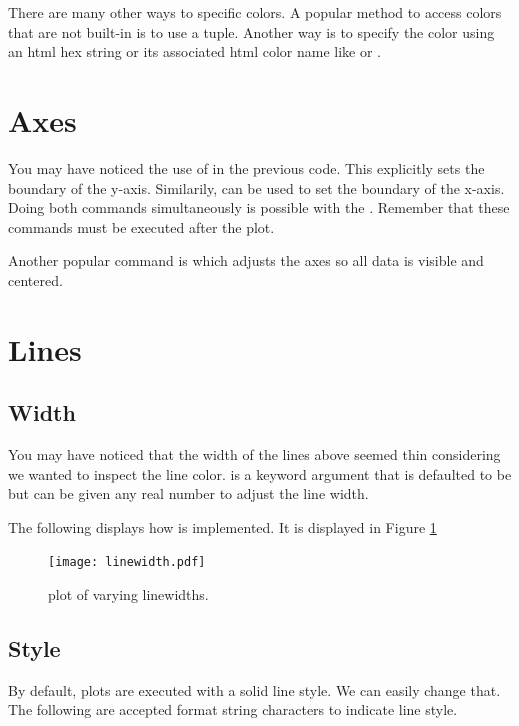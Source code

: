 There are many other ways to specific colors. A popular method to access colors that are not built-in is to use a  tuple. Another way is to specify the color using an html hex string or its associated html color name like  or . 

\section*{Axes}
You may have noticed the use of  in the previous code. This explicitly sets the boundary of the y-axis. Similarily,  can be used to set the boundary of the x-axis. 
Doing both commands simultaneously is possible with the . 
Remember that these commands must be executed after the plot. 

Another popular command is  which adjusts the axes so all data is visible and centered. 

\section*{Lines}
\subsection*{Width}
You may have noticed that the width of the lines above seemed thin considering we wanted to inspect the line color.  is a keyword argument that is defaulted to be  but can be given any real number to adjust the line width. 

The following displays how  is implemented. It is displayed in Figure \ref{linewidth}


\begin{figure} 
\texttt{[image: linewidth.pdf]}
\caption{plot of varying linewidths.}
\label{linewidth} 
\end{figure}

\subsection*{Style}
By default, plots are executed with a solid line style. We can easily change that. The following are accepted format string characters to indicate line style. 

